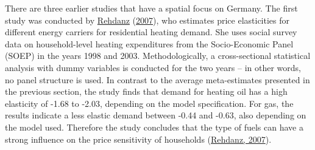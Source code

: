 \documentclass[12pt,twoside]{reedthesis}
\begin{document}
There are three earlier studies that have a spatial focus on Germany. The first study was conducted by \protect\hyperlink{ref-rehdanz07}{Rehdanz} (\protect\hyperlink{ref-rehdanz07}{2007}), who estimates price elasticities for different energy carriers for residential heating demand. She uses social survey data on household-level heating expenditures from the Socio-Economic Panel (SOEP) in the years 1998 and 2003. Methodologically, a cross-sectional statistical analysis with dummy variables is conducted for the two years -- in other words, no panel structure is used. In contrast to the average meta-estimates presented in the previous section, the study finds that demand for heating oil has a high elasticity of -1.68 to -2.03, depending on the model specification. For gas, the results indicate a less elastic demand between -0.44 and -0.63, also depending on the model used. Therefore the study concludes that the type of fuels can have a strong influence on the price sensitivity of households (\protect\hyperlink{ref-rehdanz07}{Rehdanz, 2007}).
\end{document}
